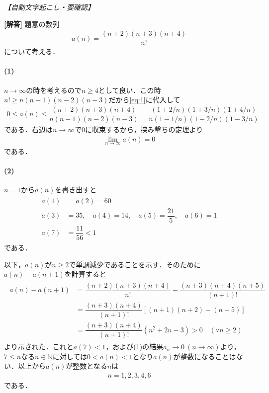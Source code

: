 \documentclass[../../main.tex]{subfiles}
\begin{document}
\begin{oframed}
  
\end{oframed}

\begin{flushright}
  \footnotesize\textit{【自動文字起こし・要確認】}
\end{flushright}

{\bf [解答]}
題意の数列
\begin{align}
  a(n)=\dfrac{(n+2)(n+3)(n+4)}{n!} \label{eq:1}
\end{align}
について考える．

\paragraph{(1)}

$n\to\infty$の時を考えるので$n \ge 4$として良い．この時$n! \ge n(n-1)(n-2)(n-3)$だから\cref{eq:1}に代入して
\begin{align}
  0 \le a(n) \le \dfrac{(n+2)(n+3)(n+4)}{n(n-1)(n-2)(n-3)} = \dfrac{(1+2/n)(1+3/n)(1+4/n)}{n(1-1/n)(1-2/n)(1-3/n)}
\end{align}
である．右辺は$n\to\infty$で$0$に収束するから，挟み撃ちの定理より
\begin{align}
  \lim_{n\to\infty}a(n) = 0
\end{align}
である．

\paragraph{(2)}
$n=1$から$a(n)$を書き出すと
\begin{align}
  \begin{split}
    a(1)&=a(2)=60 \\
    a(3)&=35,\quad a(4)=14,\quad a(5)=\dfrac{21}{5},\quad a(6)=1 \\
    a(7)&=\dfrac{11}{56}<1
  \end{split} \label{eq:2}
\end{align}
である．

以下，$a(n)$が$n\ge2$で単調減少であることを示す．そのために$a(n)-a(n+1)$を計算すると
\begin{align}
  \begin{split}
    a(n)-a(n+1)
    &=\dfrac{(n+2)(n+3)(n+4)}{n!} - \dfrac{(n+3)(n+4)(n+5)}{(n+1)!} \\
    &=\dfrac{(n+3)(n+4)}{(n+1)!}\left[(n+1)(n+2)-(n+5)\right] \\
    &=\dfrac{(n+3)(n+4)}{(n+1)!}(n^2+2n-3)>0 \quad(\because n\ge2)
  \end{split}
\end{align}
より示された．これと$a(7)<1$，および(1)の結果$a_n\to0\ (n\to\infty)$より，$7\le n$なる$n\in\mathbb{N}$に対しては$0<a(n)<1$となり$a(n)$が整数になることはない．以上から$a(n)$が整数となる$n$は
\begin{align}
  n=1,2,3,4,6
\end{align}
である．
\end{document}
